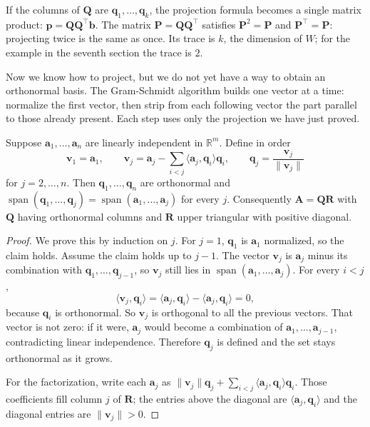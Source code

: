 If the columns of $\mathbf{Q}$ are $\mathbf{q}_{1},\dots,\mathbf{q}_{k}$, the projection formula becomes a
single matrix product: $\mathbf{p}=\mathbf{Q}\mathbf{Q}^{\top}\mathbf{b}$. The matrix
$\mathbf{P}=\mathbf{Q}\mathbf{Q}^{\top}$ satisfies $\mathbf{P}^{2}=\mathbf{P}$ and
$\mathbf{P}^{\top}=\mathbf{P}$: projecting twice is the same as once. Its trace is $k$,
the dimension of $W$; for the example in the seventh section the trace is $2$.

Now we know how to project, but we do not yet have a way to obtain an orthonormal basis.
The Gram-Schmidt algorithm builds one vector at a time: normalize the first vector, then strip
from each following vector the part parallel to those already present. Each step
uses only the projection we have just proved.

\begin{teorema}
Suppose $\mathbf{a}_{1},\dots,\mathbf{a}_{n}$ are linearly independent in $\mathbb{R}^{m}$.
Define in order
\[
  \mathbf{v}_{1}=\mathbf{a}_{1},\qquad
  \mathbf{v}_{j}=\mathbf{a}_{j}-\sum_{i<j}\langle\mathbf{a}_{j},\mathbf{q}_{i}\rangle\mathbf{q}_{i},
  \qquad
  \mathbf{q}_{j}=\frac{\mathbf{v}_{j}}{\|\mathbf{v}_{j}\|}
\]
for $j=2,\dots,n$. Then $\mathbf{q}_{1},\dots,\mathbf{q}_{n}$ are orthonormal and
$\operatorname{span}(\mathbf{q}_{1},\dots,\mathbf{q}_{j})
=\operatorname{span}(\mathbf{a}_{1},\dots,\mathbf{a}_{j})$ for every $j$. Consequently
$\mathbf{A}=\mathbf{Q}\mathbf{R}$ with $\mathbf{Q}$ having orthonormal columns and
$\mathbf{R}$ upper triangular with positive diagonal.
\end{teorema}

\begin{proof}
We prove this by induction on $j$. For $j=1$, $\mathbf{q}_{1}$ is
$\mathbf{a}_{1}$ normalized, so the claim holds. Assume the claim holds up to $j-1$.
The vector $\mathbf{v}_{j}$ is $\mathbf{a}_{j}$ minus its combination with
$\mathbf{q}_{1},\dots,\mathbf{q}_{j-1}$, so $\mathbf{v}_{j}$ still lies in
$\operatorname{span}(\mathbf{a}_{1},\dots,\mathbf{a}_{j})$. For every $i<j$,
\[
  \langle\mathbf{v}_{j},\mathbf{q}_{i}\rangle
  =\langle\mathbf{a}_{j},\mathbf{q}_{i}\rangle-\langle\mathbf{a}_{j},\mathbf{q}_{i}\rangle=0,
\]
because $\mathbf{q}_{i}$ is orthonormal. So $\mathbf{v}_{j}$ is orthogonal to all the
previous vectors. That vector is not zero: if it were, $\mathbf{a}_{j}$ would become a
combination of $\mathbf{a}_{1},\dots,\mathbf{a}_{j-1}$, contradicting linear independence.
Therefore $\mathbf{q}_{j}$ is defined and the set stays orthonormal as it grows.

For the factorization, write each $\mathbf{a}_{j}$ as
$\|\mathbf{v}_{j}\|\mathbf{q}_{j}+\sum_{i<j}\langle\mathbf{a}_{j},\mathbf{q}_{i}\rangle\mathbf{q}_{i}$.
Those coefficients fill column $j$ of $\mathbf{R}$; the entries above the diagonal are
$\langle\mathbf{a}_{j},\mathbf{q}_{i}\rangle$ and the diagonal entries are $\|\mathbf{v}_{j}\|>0$.
\end{proof}

